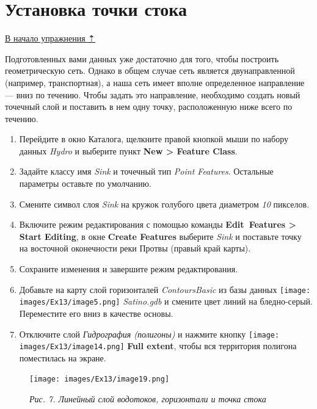 \documentclass[12pt,]{book}
\begin{document}
\hypertarget{network-hydro-sink}{%
\section{Установка точки стока}\label{network-hydro-sink}}

\protect\hyperlink{network-hydro}{В начало упражнения ⇡}

Подготовленных вами данных уже достаточно для того, чтобы построить геометрическую сеть. Однако в общем случае сеть является двунаправленной (например, транспортная), а наша сеть имеет вполне определенное направление --- вниз по течению. Чтобы задать это направление, необходимо создать новый точечный слой и поставить в нем одну точку, расположенную ниже всего по течению.

\begin{enumerate}
\def\labelenumi{\arabic{enumi}.}
\item
  Перейдите в окно Каталога, щелкните правой кнопкой мыши по набору данных \emph{Hydro} и выберите пункт \textbf{New \textgreater{} Feature Class}.
\item
  Задайте классу имя \emph{Sink} и точечный тип \emph{Point Features}. Остальные параметры оставьте по умолчанию.
\item
  Смените символ слоя \emph{Sink} на кружок голубого цвета диаметром \emph{10} пикселов.
\item
  Включите режим редактирования с помощью команды \textbf{Edit~Features \textgreater{} Start Editing}, в окне \textbf{Create Features} выберите \emph{Sink} и поставьте точку на восточной оконечности реки Протвы (правый край карты).
\item
  Сохраните изменения и завершите режим редактирования.
\item
  Добавьте на карту слой горизонталей \emph{ContoursBasic} из базы данных \texttt{[image: images/Ex13/image5.png]} \emph{Satino.gdb} и смените цвет линий на бледно-серый. Переместите его вниз в качестве основы.
\item
  Отключите слой \emph{Гидрография (полигоны)} и нажмите кнопку \texttt{[image: images/Ex13/image14.png]} \textbf{Full extent}, чтобы вся территория полигона поместилась на экране.
\end{enumerate}

\begin{figure}
\centering
\texttt{[image: images/Ex13/image19.png]}
\caption{\emph{Рис. 7. Линейный слой водотоков, горизонтали и точка стока}}
\end{figure}
\end{document}
